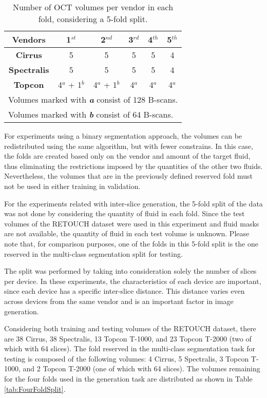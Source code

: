 \begin{table*}[!ht]
	\setlength{\tabcolsep}{6pt}
	\renewcommand{\arraystretch}{1.3}
	\caption{Number of OCT volumes per vendor in each fold, considering a 5-fold split.}
	\centering
	\begin{tabular}{|c|c|c|c|c|c|}
		\hline
		\textbf{Vendors} & \textbf{1$^{st}$} & \textbf{2$^{nd}$} & \textbf{3$^{rd}$} & \textbf{4$^{th}$} & \textbf{5$^{th}$} \\
		\hline
		\textbf{Cirrus} & 5 & 5 & 5 & 5 & 4 \\
		\textbf{Spectralis} & 5 & 5 & 5 & 5 & 4 \\
		\textbf{Topcon} & 4$^{a}$ + 1$^{b}$ & 4$^{a}$ + 1$^{b}$ & 4$^{a}$ & 4$^{a}$ & 4$^{a}$ \\
		\hline
		\multicolumn{6}{l}{Volumes marked with \textbf{\textit{a}} consist of 128 B-scans.} \\
		\multicolumn{6}{l}{Volumes marked with \textbf{\textit{b}} consist of 64 B-scans.} \\
	\end{tabular}
	\label{tab:FiveFoldSplit}
\end{table*}

For experiments using a binary segmentation approach, the volumes can be redistributed using the same algorithm, but with fewer constrains. In this case, the folds are created based only on the vendor and amount of the target fluid, thus eliminating the restrictions imposed by the quantities of the other two fluids. Nevertheless, the volumes that are in the previously defined reserved fold must not be used in either training in validation.
\par
For the experiments related with inter-slice generation, the 5-fold split of the data was not done by considering the quantity of fluid in each fold. Since the test volumes of the RETOUCH dataset were used in this experiment and fluid masks are not available, the quantity of fluid in each test volume is unknown. Please note that, for comparison purposes, one of the folds in this 5-fold split is the one reserved in the multi-class segmentation split for testing.
\par
The split was performed by taking into consideration solely the number of slices per device. In these experiments, the characteristics of each device are important, since each device has a specific inter-slice distance. This distance varies even across devices from the same vendor and is an important factor in image generation.
\par
Considering both training and testing volumes of the RETOUCH dataset, there are 38 Cirrus, 38 Spectralis, 13 Topcon T-1000, and 23 Topcon T-2000 (two of which with 64 slices). The fold reserved in the multi-class segmentation task for testing is composed of the following volumes: 4 Cirrus, 5 Spectralis, 3 Topcon T-1000, and 2 Topcon T-2000 (one of which with 64 slices). The volumes remaining for the four folds used in the generation task are distributed as shown in Table \ref{tab:FourFoldSplit}.

